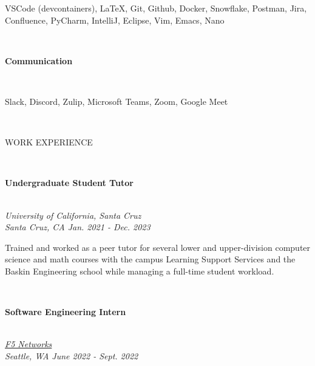 \documentclass[letterpaper,10pt]{article}
\begin{document}
\begin{multicols*}{2}
\begin{minipage}{.45\textwidth}
    \begin{flushleft}
      VSCode (devcontainers), \LaTeX, Git, Github, Docker, Snowflake, Postman, Jira, Confluence, PyCharm, IntelliJ, Eclipse, Vim, Emacs, Nano
    \end{flushleft}
  \end{minipage}
  \vspace{.5em} \\
  \begin{large} \textbf{Communication} \end{large}
  \vspace{3px} \\ \indent
  \begin{minipage}{.45\textwidth}
    \begin{flushleft}
      Slack, Discord, Zulip, Microsoft Teams, Zoom, Google Meet
    \end{flushleft}
  \end{minipage}
  \columnbreak \\
  \begin{LARGE}
    \faBriefcase\hspace{5px}WORK EXPERIENCE
  \end{LARGE}
  \vspace{.5em} \\
  \begin{large} \textbf{Undergraduate Student Tutor} \end{large} \\
  \textit{University of California, Santa Cruz \\ Santa Cruz, CA \hfill Jan. 2021 - Dec. 2023}
  \vspace{5px} \\
  \begin{minipage}{.5\textwidth}
    \begin{flushleft}
      Trained and worked as a peer tutor for several lower and upper-division computer science and math courses with the campus Learning Support Services and the Baskin Engineering school while managing a full-time student workload.
    \end{flushleft}
  \end{minipage}
  \vspace{.5em} \\
  \begin{large} \textbf{Software Engineering Intern} \end{large} \\
  \textit{\href{https://www.f5.com/}{F5 Networks} \\ Seattle, WA \hfill June 2022 - Sept. 2022}

\end{multicols*}
\end{document}
